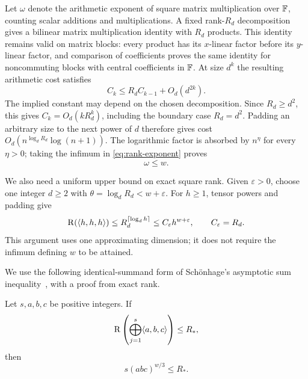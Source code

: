 Let $\omega$ denote the arithmetic exponent of square matrix
multiplication over $\mathbb F$, counting scalar additions and multiplications.
A fixed rank-$R_d$ decomposition gives a bilinear matrix multiplication
identity with $R_d$ products.  This identity remains valid on matrix
blocks: every product has its $x$-linear factor before its $y$-linear
factor, and comparison of coefficients proves the same identity for
noncommuting blocks with central coefficients in $\mathbb F$.  At size $d^k$
the resulting arithmetic cost satisfies
\[
 C_k\leq R_d C_{k-1}+O_d(d^{2k}).
\]
The implied constant may depend on the chosen decomposition.  Since
$R_d\geq d^2$, this gives $C_k=O_d(kR_d^k)$, including the boundary
case $R_d=d^2$.  Padding an arbitrary size to the next power of $d$
therefore gives cost $O_d(n^{\log_d R_d}\log(n+1))$.  The logarithmic
factor is absorbed by $n^\eta$ for every $\eta>0$; taking the
infimum in \eqref{eq:rank-exponent} proves
\begin{equation}\label{eq:omega-rank-exponent}
 \omega\leq w.
\end{equation}

We also need a uniform upper bound on exact square rank.  Given
$\varepsilon>0$, choose one integer $d\geq2$ with
$\theta=\log_d R_d<w+\varepsilon$.  For $h\geq1$, tensor powers and
padding give
\begin{equation}\label{eq:square-rank-upper}
 \operatorname{R}(\langle h,h,h\rangle)
 \leq R_d^{\lceil\log_d h\rceil}
 \leq C_\varepsilon h^{w+\varepsilon},
 \qquad C_\varepsilon=R_d.
\end{equation}
This argument uses one approximating dimension; it does not require the
infimum defining $w$ to be attained.

We use the following identical-summand form of Sch\"onhage's asymptotic
sum inequality~\cite{Schonhage1981}, with a proof from exact rank.

\begin{lemma}\label{lem:direct-sum}
Let $s,a,b,c$ be positive integers.  If
\[
 \operatorname{R}\left(\bigoplus_{j=1}^{s}\langle a,b,c\rangle\right)\leq R_*,
\]
then
\begin{equation}\label{eq:identical-direct-sum}
 s(abc)^{w/3}\leq R_*.
\end{equation}
\end{lemma}

